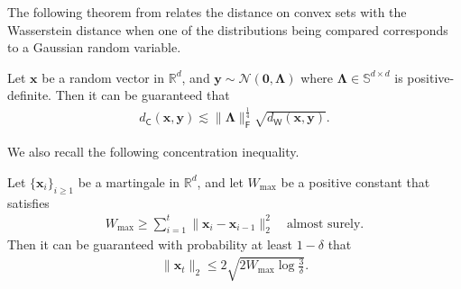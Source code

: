 The following theorem from \cite{nourdin2021multivariate} relates the distance on convex sets with the Wasserstein distance when one of the distributions being compared corresponds to a Gaussian random variable.
\begin{customtheorem}\label{thm:Gaussian-convex-Wass}
Let $\bm{x}$ be a random vector in $\mathbb{R}^d$, and $\bm{y} \sim \mathcal{N}(\bm{0},\bm{\Lambda})$ where $\bm{\Lambda} \in \mathbb{S}^{d \times d}$ is positive-definite. Then it can be guaranteed that
\begin{align*}
d_{\mathsf{C}}(\bm{x},\bm{y}) \lesssim \|\bm{\Lambda}\|_{\mathsf{F}}^{\frac{1}{4}}\sqrt{d_{\mathsf{W}}(\bm{x},\bm{y})}.
\end{align*}
\end{customtheorem}

We also recall the following concentration inequality. 

\begin{customtheorem}\label{thm:vector-Azuma}
Let $\{\bm{x}_i\}_{i \geq 1}$ be a martingale in $\mathbb{R}^d$, and let $W_{\max}$ be a positive constant that satisfies
\begin{align*}
W_{\max} \geq \sum_{i=1}^t \|\bm{x}_i - \bm{x}_{i-1}\|_2^2 \quad \text{almost surely.}
\end{align*}
Then it can be guaranteed with probability at least $1-\delta$ that
\begin{align*}
\|\bm{x}_t\|_2 \leq 2\sqrt{2W_{\max}\log \frac{3}{\delta}}.
\end{align*}
\end{customtheorem}

